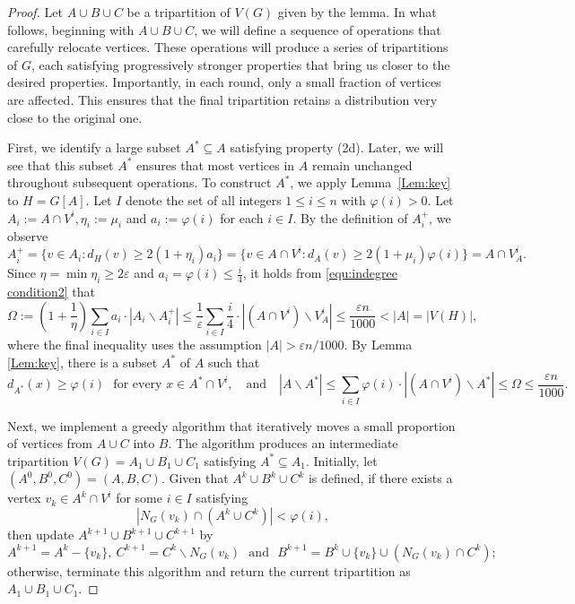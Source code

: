 \documentclass{aic}
\begin{document}
	\begin{proof}
		Let $A\cup B\cup C$ be a tripartition of $V(G)$ given by the lemma.
		In what follows, beginning with $A\cup B\cup C$, we will define a sequence of operations that carefully relocate vertices.
		These operations will produce a series of tripartitions of $G$,
		each satisfying progressively stronger properties that bring us closer to the desired properties.
		Importantly, in each round, only a small fraction of vertices are affected.
		This ensures that the final tripartition retains a distribution very close to the original one.
		
		\medskip
		
		First, we identify a large subset $A^* \subseteq A$ satisfying property (2d).
		Later, we will see that this subset $A^*$ ensures that most vertices in $A$ remain unchanged throughout subsequent operations.
		To construct $A^*$, we apply Lemma~\ref{Lem:key} to $H=G[A]$.
		Let $I$ denote the set of all integers $1\leq i\leq n$ with $\varphi(i)>0$.
		Let $A_i:=A\cap V^i, \eta_i:=\mu_i$ and $a_i:=\varphi(i)$ for each $i\in I$.
		By the definition of $A_i^+$,
		we observe $$A_i^+ =\{v \in A_i : d_H(v) \geq 2(1+\eta_i)a_i\}=\{v\in A\cap V^i: d_A(v)\geq 2(1+\mu_i)\varphi(i)\}= A\cap V_A^i.$$
		Since $\eta=\min \eta_i\geq 2\varepsilon$ and $a_i=\varphi(i)\leq \frac{i}{4}$,
		it holds from \eqref{equ:indegree condition2} that
		$$\Omega:=(1+\frac{1}{\eta}) \sum_{i\in I} a_i \cdot|A_i\backslash A^+_i|\leq
		\frac{1}{\varepsilon} \sum_{i\in I} \frac{i}{4}\cdot |(A\cap V^i)\backslash V^i_A|\leq \frac{\varepsilon n}{1000}<|A|=|V(H)|,$$
		where the final inequality uses the assumption $|A|>\varepsilon n/1000$.
		By Lemma \ref{Lem:key}, there is a subset $A^*$ of $A$ such that
		\begin{equation}\label{equ:indeg deg(A*)}
			d_{A^*}(x)\ge \varphi(i) \text{~~for every } x\in A^*\cap V^i,
			\mbox{~~~and~~~}
			|A\backslash A^*|\le \sum_{i\in I} \varphi(i)\cdot |(A\cap V^i)\backslash A^*|\le \Omega\le \frac{\varepsilon n}{1000}.
		\end{equation}
		
		
		\medskip
		
		Next, we implement a greedy algorithm that iteratively moves a small proportion of vertices from $A \cup C$ into $B$.
		The algorithm produces an intermediate tripartition $V(G) = A_1 \cup B_1 \cup C_1$ satisfying $A^* \subseteq A_1$.
		Initially, let $(A^{0}, B^{0}, C^{0}) = (A, B, C)$.
		Given that $A^{k}\cup B^{k}\cup C^{k}$ is defined,
		if there exists a vertex $v_k\in A^{k}\cap V^i$ for some $i\in I$ satisfying
		\begin{equation}
			\label{equ:indeg alg}
			|N_G(v_k)\cap (A^{k}\cup C^{k})|<\varphi(i),
		\end{equation}
		then update $A^{k+1}\cup B^{k+1}\cup C^{k+1}$ by
		$$A^{k+1}=A^k-\{v_k\},~C^{k+1}=C^k\backslash N_G(v_k) \text{~~and~~} B^{k+1}=B^k\cup \{v_k\}\cup (N_G(v_k)\cap C^k);$$
		otherwise, terminate this algorithm and return the current tripartition as $A_1 \cup B_1 \cup C_1$.
		

\end{proof}
\end{document}
